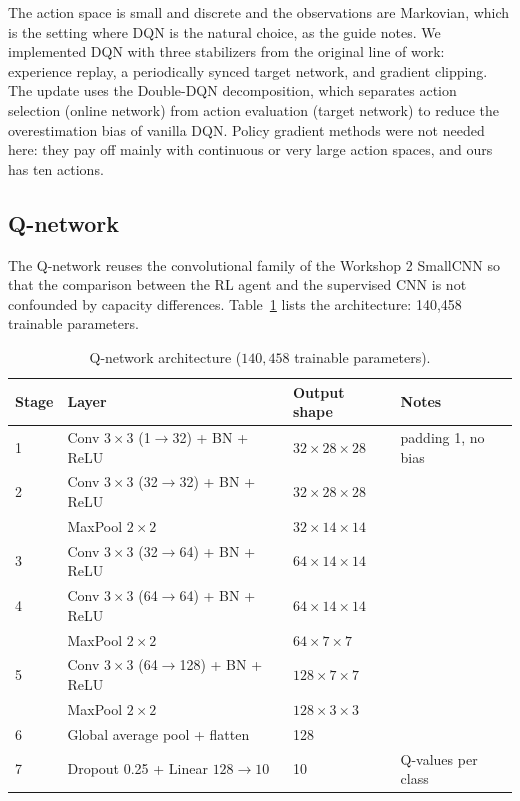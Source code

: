 \documentclass[11pt,a4paper]{article}
\begin{document}
The action space is small and discrete and the observations are Markovian, which is the setting where DQN is the natural choice, as the guide notes. We implemented DQN with three stabilizers from the original line of work: experience replay, a periodically synced target network, and gradient clipping. The update uses the Double-DQN decomposition, which separates action selection (online network) from action evaluation (target network) to reduce the overestimation bias of vanilla DQN. Policy gradient methods were not needed here: they pay off mainly with continuous or very large action spaces, and ours has ten actions.

\subsection{Q-network}

The Q-network reuses the convolutional family of the Workshop 2 SmallCNN so that the comparison between the RL agent and the supervised CNN is not confounded by capacity differences. Table~\ref{tab:qnet} lists the architecture: 140{,}458 trainable parameters.

\begin{table}[h]
\centering
\caption{Q-network architecture ($140{,}458$ trainable parameters).}
\label{tab:qnet}
\begin{tabular}{llll}
\toprule
Stage & Layer & Output shape & Notes \\
\midrule
1 & Conv $3{\times}3$ (1$\to$32) + BN + ReLU & $32{\times}28{\times}28$ & padding 1, no bias \\
2 & Conv $3{\times}3$ (32$\to$32) + BN + ReLU & $32{\times}28{\times}28$ & \\
   & MaxPool $2{\times}2$ & $32{\times}14{\times}14$ & \\
3 & Conv $3{\times}3$ (32$\to$64) + BN + ReLU & $64{\times}14{\times}14$ & \\
4 & Conv $3{\times}3$ (64$\to$64) + BN + ReLU & $64{\times}14{\times}14$ & \\
   & MaxPool $2{\times}2$ & $64{\times}7{\times}7$ & \\
5 & Conv $3{\times}3$ (64$\to$128) + BN + ReLU & $128{\times}7{\times}7$ & \\
   & MaxPool $2{\times}2$ & $128{\times}3{\times}3$ & \\
6 & Global average pool + flatten & 128 & \\
7 & Dropout 0.25 + Linear $128 \to 10$ & 10 & Q-values per class \\
\bottomrule
\end{tabular}
\end{table}
\end{document}
